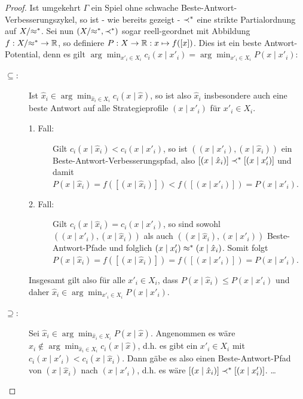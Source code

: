 \begin{proof}
	Ist umgekehrt $\Gamma$ ein Spiel ohne schwache Beste-Antwort-Verbesserungszykel, so ist - wie bereits gezeigt - $\prec^\ast$ eine strikte Partialordnung auf $X/{\approx^\ast}$. Sei nun $(X/{\approx^\ast}, \prec^\ast)$ sogar reell-geordnet mit Abbildung $f: X/{\approx^\ast} \to \mathbb{R}$, so definiere $P: X \to \mathbb{R}: x \mapsto f([x])$. Dies ist ein beste Antwort-Potential, denn es gilt $\arg \min_{x'_i \in X_i}c_i(x \mid x'_i) = \arg \min_{x'_i \in X_i} P(x \mid x'_i)$:
	\begin{description}
		\item[\glqq$\bm{\subseteq}$\grqq:] Ist $\hat{x}_i \in \arg \min_{\hat{x}_i \in X_i}c_i(x \mid \hat{x})$, so ist also $\hat{x}_i$ insbesondere auch eine beste Antwort auf alle Strategieprofile $(x \mid x'_i)$ für $x'_i \in X_i$.
			\begin{description}
				\item[1. Fall:] Gilt $c_i(x \mid \hat{x}_i) < c_i(x \mid x'_i)$, so ist $((x \mid x'_i), (x \mid \hat{x}_i))$ ein Beste-Antwort-Verbesserungspfad, also $[(x \mid \hat{x}_i)] \prec^\ast [(x \mid x'_i)]$ und damit $P(x \mid \hat{x}_i) = f([(x \mid \hat{x}_i)]) < f ([(x \mid x'_i)]) = P(x \mid x'_i)$.
				\item[2. Fall:] Gilt $c_i(x \mid \hat{x}_i) = c_i(x \mid x'_i)$, so sind sowohl $((x \mid x'_i), (x \mid \hat{x}_i))$ als auch $((x \mid \hat{x}_i), (x \mid x'_i))$ Beste-Antwort-Pfade und folglich $(x \mid x'_i) \approx^\ast (x \mid \hat{x}_i)$. Somit folgt $P(x \mid \hat{x}_i) = f([(x \mid \hat{x}_i)]) = f([(x \mid x'_i)]) = P(x \mid x'_i)$.
			\end{description}
			Insgesamt gilt also für alle $x'_i \in X_i$, dass $P(x \mid \hat{x}_i) \leq P(x \mid x'_i)$ und daher $\hat{x}_i \in \arg \min_{x'_i \in X_i} P(x \mid x'_i)$.
		\item[\glqq$\bm{\supseteq}$\grqq:] Sei $\hat{x}_i \in \arg \min_{\hat{x}_i \in X_i}P(x \mid \hat{x})$. Angenommen es wäre $\hat{x}_i \notin \arg \min_{\hat{x}_i \in X_i}c_i(x \mid \hat{x})$, d.h. es gibt ein $x'_i \in X_i$ mit $c_i(x \mid x'_i) < c_i(x \mid \hat{x}_i)$. Dann gäbe es also einen Beste-Antwort-Pfad von $(x \mid \hat{x}_i)$ nach $(x \mid x'_i)$, d.h. es wäre $[(x \mid \hat{x}_i)] \prec^\ast [(x \mid x'_i)]$. \dots
		
	\end{description}
\end{proof}

